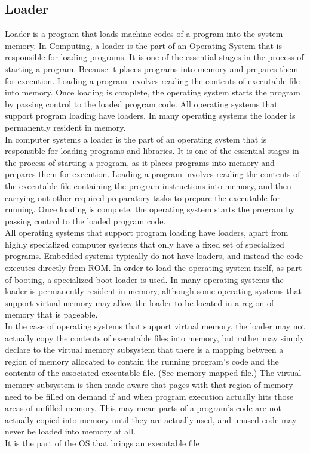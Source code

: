 \documentclass[12pt]{article}
\begin{document}
\subsection{Loader}
Loader is a program that loads machine codes of a program into the system memory. In Computing, a loader is the part of an Operating System that is responsible for loading programs. It is one of the essential stages in the process of starting a program. Because it places programs into memory and prepares them for execution. Loading a program involves reading the contents of executable file into memory.  Once loading is complete, the operating system starts the program by passing control to the loaded program code. All operating systems that support program loading have loaders. In many operating systems the loader is permanently resident in memory. \\In computer systems a loader is the part of an operating system that is responsible for loading programs and libraries. It is one of the essential stages in the process of starting a program, as it places programs into memory and prepares them for execution. Loading a program involves reading the contents of the executable file containing the program instructions into memory, and then carrying out other required preparatory tasks to prepare the executable for running. Once loading is complete, the operating system starts the program by passing control to the loaded program code.\\All operating systems that support program loading have loaders, apart from highly specialized computer systems that only have a fixed set of specialized programs. Embedded systems typically do not have loaders, and instead the code executes directly from ROM. In order to load the operating system itself, as part of booting, a specialized boot loader is used. In many operating systems the loader is permanently resident in memory, although some operating systems that support virtual memory may allow the loader to be located in a region of memory that is pageable.\\In the case of operating systems that support virtual memory, the loader may not actually copy the contents of executable files into memory, but rather may simply declare to the virtual memory subsystem that there is a mapping between a region of memory allocated to contain the running program's code and the contents of the associated executable file. (See memory-mapped file.) The virtual memory subsystem is then made aware that pages with that region of memory need to be filled on demand if and when program execution actually hits those areas of unfilled memory. This may mean parts of a program's code are not actually copied into memory until they are actually used, and unused code may never be loaded into memory at all.\\It is the part of the OS that brings an executable file 
\end{document}
